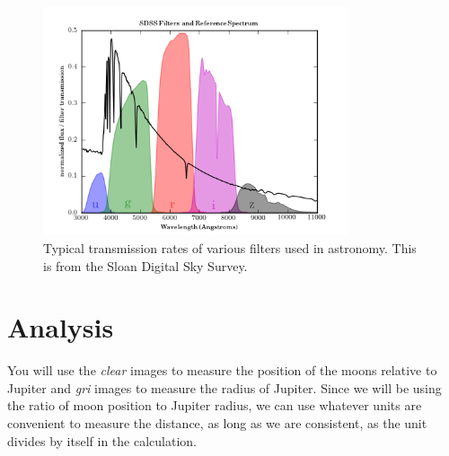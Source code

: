 \begin{figure}
	\centering
	\includegraphics[width=0.8\textwidth]{jupiter-density/fig_sdss_filters_1}
	\caption{Typical transmission rates of various filters used in astronomy. This is from the Sloan Digital Sky Survey.}\label{jd:fig:filters}
\end{figure}

%
%
%
\section{Analysis}

You will use the \textit{clear} images to measure the position of the moons relative to Jupiter and
\textit{gri} images to measure the radius of Jupiter. Since we will be using the ratio of moon position to Jupiter radius, we can use whatever units are convenient to measure the distance, as long as we are consistent, as the unit divides by itself in the calculation.

